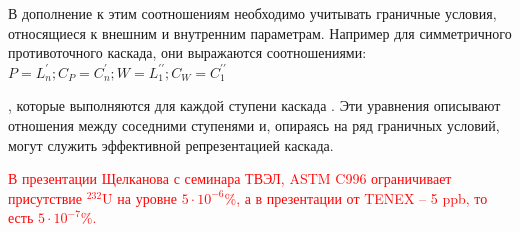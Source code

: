 В дополнение к этим соотношениям необходимо учитывать граничные условия, относящиеся к внешним и внутренним параметрам. Например для симметричного противоточного каскада, они выражаются соотношениями: 
$P=L_{n}^{\prime} ; C_{P}=C_{n}^{\prime} ; W=L_{1}^{\prime \prime} ; C_{W}=C_{1}^{\prime \prime}$

, которые выполняются для каждой ступени каскада \cite{palkinDeterminationOptimalParameters2012}. Эти уравнения описывают отношения между соседними ступенями и, опираясь на ряд граничных условий, могут служить эффективной репрезентацией каскада. 






\textcolor{red}{В презентации Щелканова с семинара ТВЭЛ, ASTM C996 ограничивает присутствие $^{232}$U на уровне $5\cdot10^{-6}$\%, а в презентации от TENEX -- 5 ppb, то есть $5\cdot10^{-7}$\%.}









